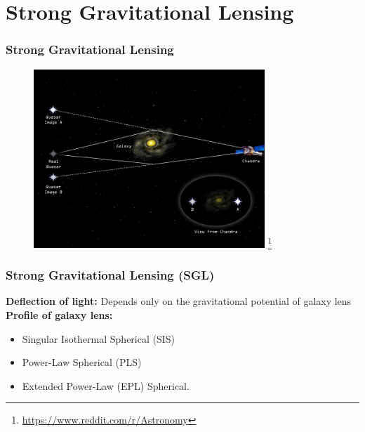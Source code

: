 \documentclass[xcolor=table,bigger]{beamer}
\begin{document}
\section{ Strong Gravitational Lensing}
\begin{frame}
 \frametitle{Strong Gravitational Lensing}
\begin{figure}[ht!]
\centering
\includegraphics[width=87mm]{cp2}
\let\thefootnote\relax\footnote{\url{https://www.reddit.com/r/Astronomy}}
\end{figure} 
 \end{frame}
 \begin{frame}
 \frametitle{Strong Gravitational Lensing (SGL)}
 \textbf{Deflection of light:} Depends only on the gravitational potential of galaxy lens
\vspace{5mm}\\
 \textbf{Profile of galaxy lens:}
\vspace{2mm}\\
\begin{itemize}
\item
Singular Isothermal Spherical (SIS)
\vspace{3mm}\\
\item
Power-Law Spherical (PLS)
\vspace{3mm}\\
\item
Extended Power-Law (EPL) Spherical. 
\end{itemize}
 \end{frame}
\end{document}
